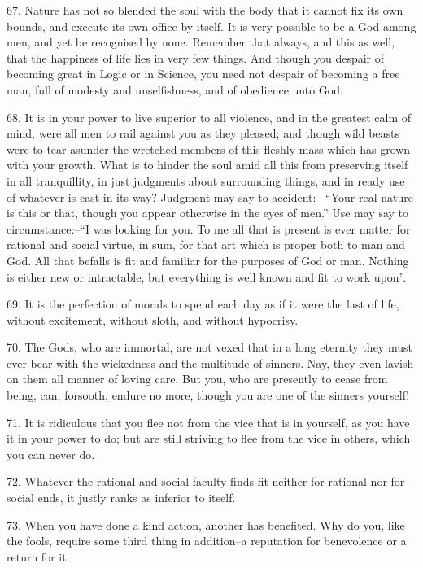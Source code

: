 \documentclass{book}
\begin{document}
67. Nature has not so blended the soul with the body that it cannot
fix its own bounds, and execute its own office by itself. It is very
possible to be a God among men, and yet be recognised by
none. Remember that always, and this as well, that the happiness of
life lies in very few things. And though you despair of becoming great
in Logic or in Science, you need not despair of becoming a free man,
full of modesty and unselfishness, and of obedience unto God.

68. It is in your power to live superior to all violence, and in the
greatest calm of mind, were all men to rail against you as they
pleased; and though wild beasts were to tear asunder the wretched
members of this fleshly mass which has grown with your growth. What is
to hinder the soul amid all this from preserving itself in all
tranquillity, in just judgments about surrounding things, and in ready
use of whatever is cast in its way? Judgment may say to accident:--
``Your real nature is this or that, though you appear otherwise in the
eyes of men.'' Use may say to circumstance:--``I was looking for
you. To me all that is present is ever matter for rational and social
virtue, in sum, for that art which is proper both to man and God. All
that befalls is fit and familiar for the purposes of God or
man. Nothing is either new or intractable, but everything is well
known and fit to work upon''.

69. It is the perfection of morals to spend each day as if it were the
last of life, without excitement, without sloth, and without
hypocrisy.

70. The Gods, who are immortal, are not vexed that in a long eternity
they must ever bear with the wickedness and the multitude of
sinners. Nay, they even lavish on them all manner of loving care. But
you, who are presently to cease from being, can, forsooth, endure no
more, though you are one of the sinners yourself!

71. It is ridiculous that you flee not from the vice that is in
yourself, as you have it in your power to do; but are still striving
to flee from the vice in others, which you can never do.

72. Whatever the rational and social faculty finds fit neither for
rational nor for social ends, it justly ranks as inferior to itself.

73. When you have done a kind action, another has benefited. Why do
you, like the fools, require some third thing in addition--a
reputation for benevolence or a return for it.
\end{document}
